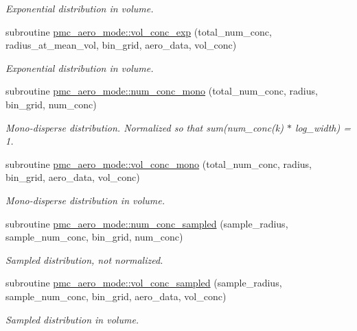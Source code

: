 \begin{DoxyCompactItemize}
\begin{DoxyCompactList}\small\item\em Exponential distribution in volume. \end{DoxyCompactList}\item 
subroutine \mbox{\hyperlink{namespacepmc__aero__mode_aa6ef6e2dc2790945150c453a171da9b5}{pmc\+\_\+aero\+\_\+mode\+::vol\+\_\+conc\+\_\+exp}} (total\+\_\+num\+\_\+conc, radius\+\_\+at\+\_\+mean\+\_\+vol, bin\+\_\+grid, aero\+\_\+data, vol\+\_\+conc)
\begin{DoxyCompactList}\small\item\em Exponential distribution in volume. \end{DoxyCompactList}\item 
subroutine \mbox{\hyperlink{namespacepmc__aero__mode_a234df72199670a154160bba53306c150}{pmc\+\_\+aero\+\_\+mode\+::num\+\_\+conc\+\_\+mono}} (total\+\_\+num\+\_\+conc, radius, bin\+\_\+grid, num\+\_\+conc)
\begin{DoxyCompactList}\small\item\em Mono-\/disperse distribution. Normalized so that sum(num\+\_\+conc(k) $\ast$ log\+\_\+width) = 1. \end{DoxyCompactList}\item 
subroutine \mbox{\hyperlink{namespacepmc__aero__mode_ad917c92b4e26574185aa1fa1de3ce361}{pmc\+\_\+aero\+\_\+mode\+::vol\+\_\+conc\+\_\+mono}} (total\+\_\+num\+\_\+conc, radius, bin\+\_\+grid, aero\+\_\+data, vol\+\_\+conc)
\begin{DoxyCompactList}\small\item\em Mono-\/disperse distribution in volume. \end{DoxyCompactList}\item 
subroutine \mbox{\hyperlink{namespacepmc__aero__mode_afd98aa0b0cb1ee7e41347a0162b7c2ee}{pmc\+\_\+aero\+\_\+mode\+::num\+\_\+conc\+\_\+sampled}} (sample\+\_\+radius, sample\+\_\+num\+\_\+conc, bin\+\_\+grid, num\+\_\+conc)
\begin{DoxyCompactList}\small\item\em Sampled distribution, not normalized. \end{DoxyCompactList}\item 
subroutine \mbox{\hyperlink{namespacepmc__aero__mode_a4526110f9b901d8cdcebdd9862ee9cb2}{pmc\+\_\+aero\+\_\+mode\+::vol\+\_\+conc\+\_\+sampled}} (sample\+\_\+radius, sample\+\_\+num\+\_\+conc, bin\+\_\+grid, aero\+\_\+data, vol\+\_\+conc)
\begin{DoxyCompactList}\small\item\em Sampled distribution in volume. \end{DoxyCompactList}\item 

\end{DoxyCompactItemize}
